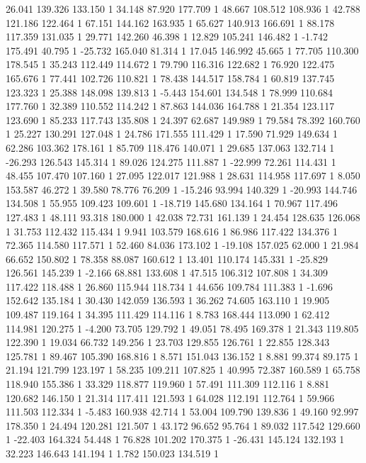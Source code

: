 	26.041 139.326 133.150 1
	34.148 87.920 177.709 1
	48.667 108.512 108.936 1
	42.788 121.186 122.464 1
	67.151 144.162 163.935 1
	65.627 140.913 166.691 1
	88.178 117.359 131.035 1
	29.771 142.260 46.398 1
	12.829 105.241 146.482 1
	-1.742 175.491 40.795 1
	-25.732 165.040 81.314 1
	17.045 146.992 45.665 1
	77.705 110.300 178.545 1
	35.243 112.449 114.672 1
	79.790 116.316 122.682 1
	76.920 122.475 165.676 1
	77.441 102.726 110.821 1
	78.438 144.517 158.784 1
	60.819 137.745 123.323 1
	25.388 148.098 139.813 1
	-5.443 154.601 134.548 1
	78.999 110.684 177.760 1
	32.389 110.552 114.242 1
	87.863 144.036 164.788 1
	21.354 123.117 123.690 1
	85.233 117.743 135.808 1
	24.397 62.687 149.989 1
	79.584 78.392 160.760 1
	25.227 130.291 127.048 1
	24.786 171.555 111.429 1
	17.590 71.929 149.634 1
	62.286 103.362 178.161 1
	85.709 118.476 140.071 1
	29.685 137.063 132.714 1
	-26.293 126.543 145.314 1
	89.026 124.275 111.887 1
	-22.999 72.261 114.431 1
	48.455 107.470 107.160 1
	27.095 122.017 121.988 1
	28.631 114.958 117.697 1
	8.050 153.587 46.272 1
	39.580 78.776 76.209 1
	-15.246 93.994 140.329 1
	-20.993 144.746 134.508 1
	55.955 109.423 109.601 1
	-18.719 145.680 134.164 1
	70.967 117.496 127.483 1
	48.111 93.318 180.000 1
	42.038 72.731 161.139 1
	24.454 128.635 126.068 1
	31.753 112.432 115.434 1
	9.941 103.579 168.616 1
	86.986 117.422 134.376 1
	72.365 114.580 117.571 1
	52.460 84.036 173.102 1
	-19.108 157.025 62.000 1
	21.984 66.652 150.802 1
	78.358 88.087 160.612 1
	13.401 110.174 145.331 1
	-25.829 126.561 145.239 1
	-2.166 68.881 133.608 1
	47.515 106.312 107.808 1
	34.309 117.422 118.488 1
	26.860 115.944 118.734 1
	44.656 109.784 111.383 1
	-1.696 152.642 135.184 1
	30.430 142.059 136.593 1
	36.262 74.605 163.110 1
	19.905 109.487 119.164 1
	34.395 111.429 114.116 1
	8.783 168.444 113.090 1
	62.412 114.981 120.275 1
	-4.200 73.705 129.792 1
	49.051 78.495 169.378 1
	21.343 119.805 122.390 1
	19.034 66.732 149.256 1
	23.703 129.855 126.761 1
	22.855 128.343 125.781 1
	89.467 105.390 168.816 1
	8.571 151.043 136.152 1
	8.881 99.374 89.175 1
	21.194 121.799 123.197 1
	58.235 109.211 107.825 1
	40.995 72.387 160.589 1
	65.758 118.940 155.386 1
	33.329 118.877 119.960 1
	57.491 111.309 112.116 1
	8.881 120.682 146.150 1
	21.314 117.411 121.593 1
	64.028 112.191 112.764 1
	59.966 111.503 112.334 1
	-5.483 160.938 42.714 1
	53.004 109.790 139.836 1
	49.160 92.997 178.350 1
	24.494 120.281 121.507 1
	43.172 96.652 95.764 1
	89.032 117.542 129.660 1
	-22.403 164.324 54.448 1
	76.828 101.202 170.375 1
	-26.431 145.124 132.193 1
	32.223 146.643 141.194 1
	1.782 150.023 134.519 1
